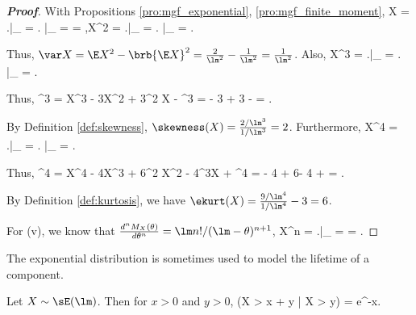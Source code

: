 \begin{proof}[\bf Proof]%
With Propositions \ref{pro:mgf_exponential}, \ref{pro:mgf_finite_moment},
\beast
\E X = \left.\right|_{} = \left. \right|_{} =  = ,\qquad \E X^2 = \left.\right|_{} = \left.  \right|_{} = .
\eeast

Thus, $\var X = \E X^2 - \brb{\E X}^2 = \frac{2}{\lm^2} - \frac{1}{\lm^2} = \frac{1}{\lm^2}$. Also,
\be
\E X^3 = \left.\right|_{} = \left.   \right|_{} = .
\ee

Thus,
\be
\E{}^3 = \E X^3 - 3\mu\E X^2 + 3\mu^2 \E X - \mu^3 =  - 3   + 3   -  = .
\ee

By Definition \ref{def:skewness}, $\skewness(X) = \frac{2/\lm^3}{1/\lm^3} = 2$. Furthermore,
\be
\E X^4 = \left.\right|_{} = \left.   \right|_{}  = .
\ee

Thus,
\be
\E{}^4 = \E X^4 - 4\mu\E X^3 + 6\mu^2 \E X^2 - 4\mu^3\E X + \mu^4 =  - 4 + 6- 4 +  =  .
\ee

By Definition \ref{def:kurtosis}, we have $\ekurt(X) = \frac{9/\lm^4}{1/\lm^4} -3 = 6$.

For (v), we know that $\frac {d^n M_X(\theta)}{d\theta^n} = \lm n!/(\lm -\theta)^{n+1}$,
\be
\E X^n = \left.\right|_{} =  = .
\ee
\end{proof}

The exponential distribution is sometimes used to model the lifetime of a component. %

\begin{proposition}\label{pro:memoryless_exponential_rv}
Let $X\sim \sE(\lm)$. Then for $x > 0$ and $y > 0$,
\be
\pro (X > x + y | X > y) = e^{-\lm x}.
\ee
\end{proposition}


